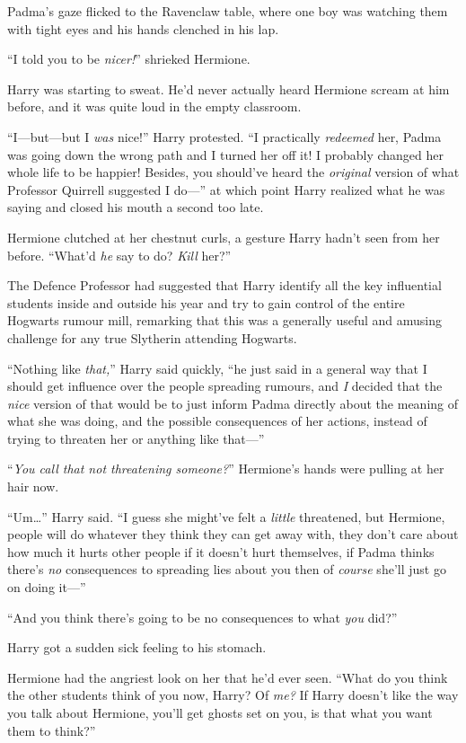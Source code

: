 Padma’s gaze flicked to the Ravenclaw table, where one boy was watching them with tight eyes and his hands clenched in his lap.


“I told you to be \emph{nicer!}” shrieked Hermione.

Harry was starting to sweat. He’d never actually heard Hermione scream at him before, and it was quite loud in the empty classroom.

“I—but—but I \emph{was} nice!” Harry protested. “I practically \emph{redeemed} her, Padma was going down the wrong path and I turned her off it! I probably changed her whole life to be happier! Besides, you should’ve heard the \emph{original} version of what Professor Quirrell suggested I do—” at which point Harry realized what he was saying and closed his mouth a second too late.

Hermione clutched at her chestnut curls, a gesture Harry hadn’t seen from her before. “What’d \emph{he} say to do? \emph{Kill} her?”

The Defence Professor had suggested that Harry identify all the key influential students inside and outside his year and try to gain control of the entire Hogwarts rumour mill, remarking that this was a generally useful and amusing challenge for any true Slytherin attending Hogwarts.

“Nothing like \emph{that,}” Harry said quickly, “he just said in a general way that I should get influence over the people spreading rumours, and \emph{I} decided that the \emph{nice} version of that would be to just inform Padma directly about the meaning of what she was doing, and the possible consequences of her actions, instead of trying to threaten her or anything like that—”

“\emph{You call that not threatening someone?}” Hermione’s hands were pulling at her hair now.

“Um…” Harry said. “I guess she might’ve felt a \emph{little} threatened, but Hermione, people will do whatever they think they can get away with, they don’t care about how much it hurts other people if it doesn’t hurt themselves, if Padma thinks there’s \emph{no} consequences to spreading lies about you then of \emph{course} she’ll just go on doing it—”

“And you think there’s going to be no consequences to what \emph{you} did?”

Harry got a sudden sick feeling to his stomach.

Hermione had the angriest look on her that he’d ever seen. “What do you think the other students think of you now, Harry? Of \emph{me?} If Harry doesn’t like the way you talk about Hermione, you’ll get ghosts set on you, is that what you want them to think?”

